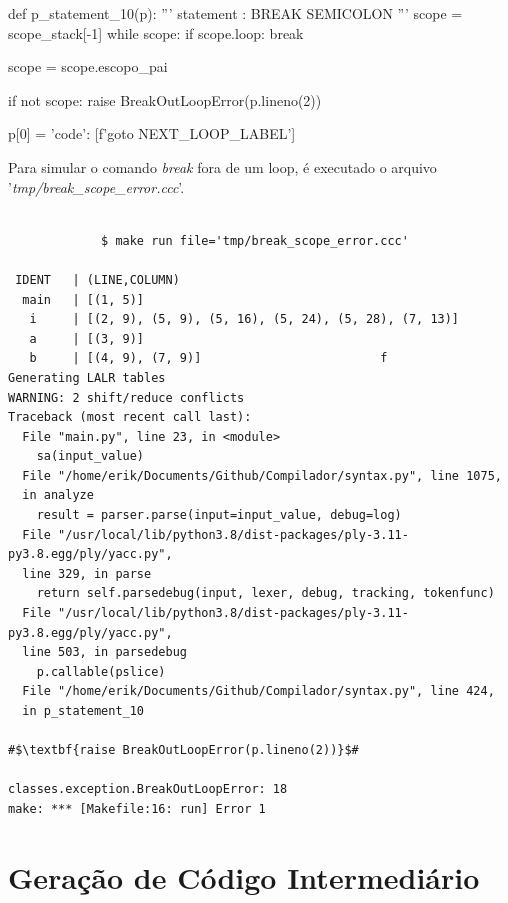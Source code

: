 \documentclass[
	12pt,				%
	openright,			%
	twoside,			%
	a4paper,			%
	english,			%
	french,				%
	spanish,			%
	brazil				%
	]{abntex2}
\begin{document}
\begin{python}
def p_statement_10(p):
    '''
    statement : BREAK SEMICOLON
    '''
    scope = scope_stack[-1]
    while scope:
        if scope.loop:
            break

        scope = scope.escopo_pai

    if not scope:
        raise BreakOutLoopError(p.lineno(2))

    p[0] = { 'code': [f'goto {NEXT_LOOP_LABEL}'] }

\end{python}
Para simular o comando \emph{break} fora de um loop, é executado
o arquivo '\emph{tmp/break\_scope\_error.ccc}'.
\begin{lstlisting}[escapechar=\#]

             $ make run file='tmp/break_scope_error.ccc'

 IDENT   | (LINE,COLUMN)                                                                                       
  main   | [(1, 5)]                                                                                            
   i     | [(2, 9), (5, 9), (5, 16), (5, 24), (5, 28), (7, 13)]                                                
   a     | [(3, 9)]                                                                                            
   b     | [(4, 9), (7, 9)]                         f                                                           
Generating LALR tables
WARNING: 2 shift/reduce conflicts
Traceback (most recent call last):
  File "main.py", line 23, in <module>
    sa(input_value)
  File "/home/erik/Documents/Github/Compilador/syntax.py", line 1075,
  in analyze
    result = parser.parse(input=input_value, debug=log)
  File "/usr/local/lib/python3.8/dist-packages/ply-3.11-py3.8.egg/ply/yacc.py",
  line 329, in parse
    return self.parsedebug(input, lexer, debug, tracking, tokenfunc)
  File "/usr/local/lib/python3.8/dist-packages/ply-3.11-py3.8.egg/ply/yacc.py",
  line 503, in parsedebug
    p.callable(pslice)
  File "/home/erik/Documents/Github/Compilador/syntax.py", line 424,
  in p_statement_10

#$\textbf{raise BreakOutLoopError(p.lineno(2))}$#

classes.exception.BreakOutLoopError: 18
make: *** [Makefile:16: run] Error 1
\end{lstlisting}

\section{Geração de Código Intermediário}
\end{document}
